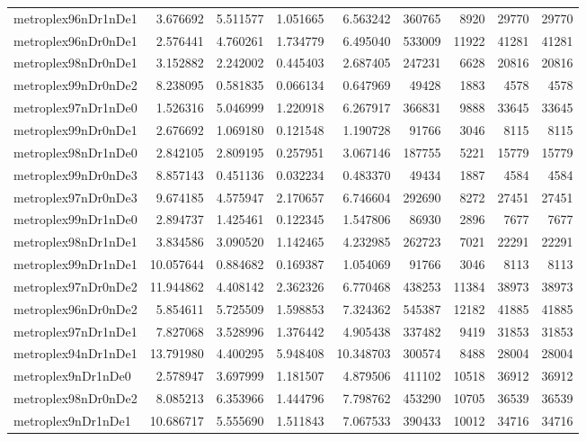 \begin{longtable}{|l|r|r|r|r|r|r|r|r|}
metroplex96nDr1nDe1 & 3.676692 & 5.511577 & 1.051665 & 6.563242 & 360765 & 8920 & 29770 & 29770 \\
metroplex96nDr0nDe1 & 2.576441 & 4.760261 & 1.734779 & 6.495040 & 533009 & 11922 & 41281 & 41281 \\
metroplex98nDr0nDe1 & 3.152882 & 2.242002 & 0.445403 & 2.687405 & 247231 & 6628 & 20816 & 20816 \\
metroplex99nDr0nDe2 & 8.238095 & 0.581835 & 0.066134 & 0.647969 & 49428 & 1883 & 4578 & 4578 \\
metroplex97nDr1nDe0 & 1.526316 & 5.046999 & 1.220918 & 6.267917 & 366831 & 9888 & 33645 & 33645 \\
metroplex99nDr0nDe1 & 2.676692 & 1.069180 & 0.121548 & 1.190728 & 91766 & 3046 & 8115 & 8115 \\
metroplex98nDr1nDe0 & 2.842105 & 2.809195 & 0.257951 & 3.067146 & 187755 & 5221 & 15779 & 15779 \\
metroplex99nDr0nDe3 & 8.857143 & 0.451136 & 0.032234 & 0.483370 & 49434 & 1887 & 4584 & 4584 \\
metroplex97nDr0nDe3 & 9.674185 & 4.575947 & 2.170657 & 6.746604 & 292690 & 8272 & 27451 & 27451 \\
metroplex99nDr1nDe0 & 2.894737 & 1.425461 & 0.122345 & 1.547806 & 86930 & 2896 & 7677 & 7677 \\
metroplex98nDr1nDe1 & 3.834586 & 3.090520 & 1.142465 & 4.232985 & 262723 & 7021 & 22291 & 22291 \\
metroplex99nDr1nDe1 & 10.057644 & 0.884682 & 0.169387 & 1.054069 & 91766 & 3046 & 8113 & 8113 \\
metroplex97nDr0nDe2 & 11.944862 & 4.408142 & 2.362326 & 6.770468 & 438253 & 11384 & 38973 & 38973 \\
metroplex96nDr0nDe2 & 5.854611 & 5.725509 & 1.598853 & 7.324362 & 545387 & 12182 & 41885 & 41885 \\
metroplex97nDr1nDe1 & 7.827068 & 3.528996 & 1.376442 & 4.905438 & 337482 & 9419 & 31853 & 31853 \\
metroplex94nDr1nDe1 & 13.791980 & 4.400295 & 5.948408 & 10.348703 & 300574 & 8488 & 28004 & 28004 \\
metroplex9nDr1nDe0 & 2.578947 & 3.697999 & 1.181507 & 4.879506 & 411102 & 10518 & 36912 & 36912 \\
metroplex98nDr0nDe2 & 8.085213 & 6.353966 & 1.444796 & 7.798762 & 453290 & 10705 & 36539 & 36539 \\
metroplex9nDr1nDe1 & 10.686717 & 5.555690 & 1.511843 & 7.067533 & 390433 & 10012 & 34716 & 34716 \\

\end{longtable}
